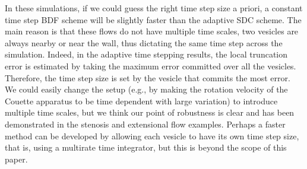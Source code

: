 In these simulations, if we could guess the right time step size a
priori, a constant time step BDF scheme will be slightly faster than
the adaptive SDC scheme. The main reason is that these flows do not
have multiple time scales, two vesicles are always nearby or near the
wall, thus dictating the same time step across the simulation.  Indeed,
in the adaptive time stepping results, the local truncation error is
estimated by taking the maximum error committed over all the vesicles.
Therefore, the time step size is set by the vesicle that commits the
most error.  We could easily change the setup (e.g., by making the
rotation velocity of the Couette apparatus to be time dependent with
large variation) to introduce multiple time scales, but we think our
point of robustness is clear and has been demonstrated in the stenosis
and extensional flow examples.  Perhaps a faster method can be
developed by allowing each vesicle to have its own time step size, that
is, using a multirate time integrator, but this is beyond the scope of
this paper.



